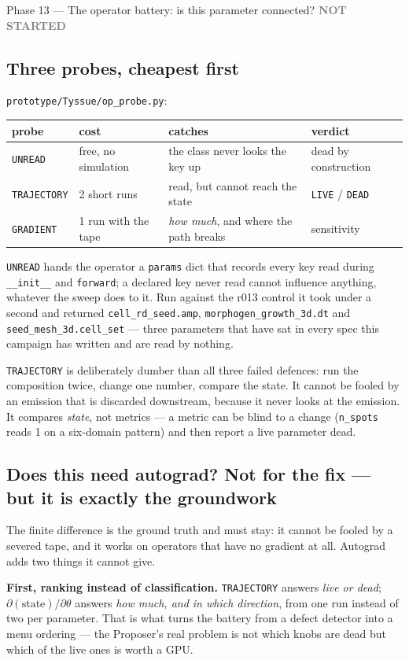 \documentclass[11pt,a4paper]{article}
\newcommand{\code}[1]{\texttt{#1}}
\newcommand{\todo}{\textcolor{grey}{\textbf{NOT STARTED}}}
\begin{document}
\begin{phasebox}{Phase 13 --- The operator battery: is this parameter connected? \hfill \todo}
\subsection*{Three probes, cheapest first}
\code{prototype/Tyssue/op\_probe.py}:

\begin{center}\small
\begin{tabular}{llll}
\toprule
probe & cost & catches & verdict \\
\midrule
\code{UNREAD} & free, no simulation & the class never looks the key up & dead by construction \\
\code{TRAJECTORY} & 2 short runs & read, but cannot reach the state & \code{LIVE} / \code{DEAD} \\
\code{GRADIENT} & 1 run with the tape & \emph{how much}, and where the path breaks & sensitivity \\
\bottomrule
\end{tabular}
\end{center}

\noindent \code{UNREAD} hands the operator a \code{params} dict that records every key read during
\code{\_\_init\_\_} and \code{forward}; a declared key never read cannot influence anything, whatever
the sweep does to it. Run against the r013 control it took under a second and returned
\code{cell\_rd\_seed.amp}, \code{morphogen\_growth\_3d.dt} and \code{seed\_mesh\_3d.cell\_set} ---
three parameters that have sat in every spec this campaign has written and are read by nothing.

\code{TRAJECTORY} is deliberately dumber than all three failed defences: run the composition twice,
change one number, compare the state. It cannot be fooled by an emission that is discarded
downstream, because it never looks at the emission. It compares \emph{state}, not metrics --- a
metric can be blind to a change (\code{n\_spots} reads 1 on a six-domain pattern) and then report a
live parameter dead.

\subsection*{Does this need autograd? Not for the fix --- but it is exactly the groundwork}
The finite difference is the ground truth and must stay: it cannot be fooled by a severed tape, and
it works on operators that have no gradient at all. Autograd adds two things it cannot give.

\textbf{First, ranking instead of classification.} \code{TRAJECTORY} answers \emph{live or dead};
$\partial(\mathrm{state})/\partial\theta$ answers \emph{how much, and in which direction}, from one run
instead of two per parameter. That is what turns the battery from a defect detector into a menu
ordering --- the Proposer's real problem is not which knobs are dead but which of the live ones is
worth a GPU.


\end{phasebox}
\end{document}
